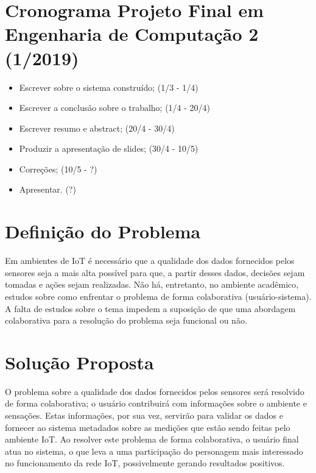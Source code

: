%
\newpage
 \section{Cronograma Projeto Final em Engenharia de Computação 2 (1/2019)}

\begin{itemize}
  \item Escrever sobre o sistema construído; (1/3 - 1/4)
  \item Escrever a conclusão sobre o trabalho; (1/4 - 20/4)
  \item Escrever resumo e abstract; (20/4 - 30/4)
  \item Produzir a apresentação de slides; (30/4 - 10/5)
  \item Correções; (10/5 - ?)
  \item Apresentar. (?)
\end{itemize}

\newpage
 \section{Definição do Problema}
 Em ambientes de \acrlong{IoT} é necessário que a qualidade dos dados fornecidos pelos sensores seja a mais alta possível para que, a partir desses dados,
 decisões sejam tomadas e ações sejam realizadas.  Não há, entretanto, no ambiente acadêmico, estudos sobre como enfrentar o problema de forma colaborativa (usuário-sistema).
 A falta de estudos sobre o tema impedem a suposição de que uma abordagem colaborativa para a resolução do problema seja funcional ou não.



 \newpage
  \section{Solução Proposta}
  O problema sobre a qualidade dos dados fornecidos pelos sensores será resolvido de forma colaborativa; o usuário contribuirá com informações sobre o ambiente e sensações. Estas informações, por sua vez, servirão para validar os dados e fornecer ao sistema metadados sobre as medições que estão sendo feitas pelo ambiente \acrshort{IoT}.
 Ao resolver este problema de forma colaborativa, o usuário final atua no sistema, o que leva a uma participação do personagem mais interessado no funcionamento da rede \acrlong{IoT}, possivelmente gerando resultados positivos.
